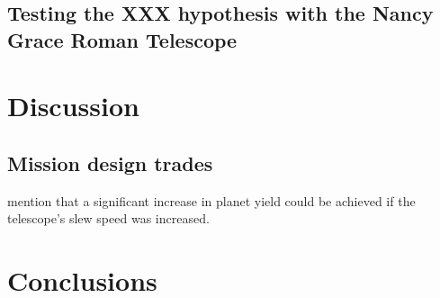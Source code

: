 \documentclass[twocolumn]{aastex631}
\begin{document}
\subsection{Testing the XXX hypothesis with the Nancy Grace Roman Telescope}



\section{Discussion}

\subsection{Mission design trades}\label{sec:mission-design-trades}
\citet{Penny2019} mention that a significant increase in planet yield could be achieved if the telescope's slew speed was increased.

\section{Conclusions}




\end{document}
